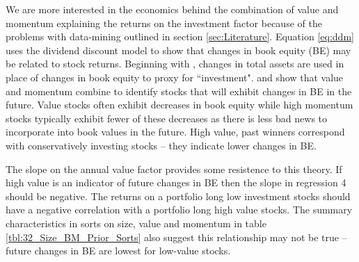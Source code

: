 We are more interested in the economics behind the combination of value and momentum
explaining the returns on the investment factor because of the problems with data-mining
outlined in section \ref{sec:Literature}. Equation \ref{eq:ddm} uses the dividend discount
model to show that changes in book equity (BE) may be related to stock returns. Beginning
with \textcite{fama2006profitability}, changes in total assets are used in place of
changes in book equity to proxy for ``investment". \textcite{kok2017facts} and
\textcite{asness2013devil} show that value and momentum combine to identify stocks that
will exhibit changes in BE in the future. Value stocks often exhibit decreases in book
equity while high momentum stocks typically exhibit fewer of these decreases as there is
less bad news to incorporate into book values in the future. High value, past winners
correspond with conservatively investing stocks -- they indicate lower changes in BE.

The slope on the annual value factor provides some resistence to this theory. If high
value is an indicator of future changes in BE then the slope in regression 4 should be
negative. The returns on a portfolio long low investment stocks should have a negative
correlation with a portfolio long high value stocks. The summary characteristics in sorts
on size, value and momentum in table \ref{tbl:32_Size_BM_Prior_Sorts} also suggest this
relationship may not be true -- future changes in BE are lowest for low-value stocks.


